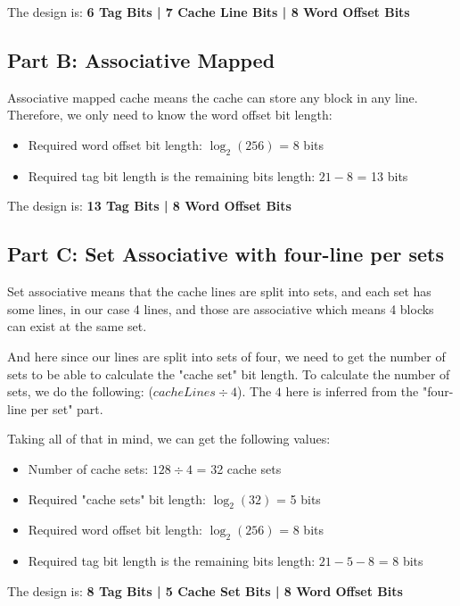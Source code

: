 \documentclass[a4paper]{article}
\begin{document}
The design is: \textbf{6 Tag Bits | 7 Cache Line Bits | 8 Word Offset Bits}

\subsection{Part B: Associative Mapped}

Associative mapped cache means the cache can store any block in any line. Therefore, we only need to know the word offset bit length:

\begin{itemize}
    \item Required word offset bit length: $\log_2(256)$ = 8 bits
    \item Required tag bit length is the remaining bits length: $21 - 8$ = 13 bits
\end{itemize}

The design is: \textbf{13 Tag Bits | 8 Word Offset Bits}

\subsection{Part C: Set Associative with four-line per sets}

Set associative means that the cache lines are split into sets, and each set has some lines, in our case 4 lines, and those are associative which means 4 blocks can exist at the same set.

And here since our lines are split into sets of four, we need to get the number of sets to be able to calculate the "cache set" bit length. To calculate the number of sets, we do the following: ($cacheLines \div 4$). The $4$ here is inferred from the "four-line per set" part.

Taking all of that in mind, we can get the following values:

\begin{itemize}
    \item Number of cache sets: $128 \div 4$ = 32 cache sets
    \item Required "cache sets" bit length: $\log_2(32)$ = 5 bits
    \item Required word offset bit length: $\log_2(256)$ = 8 bits
    \item Required tag bit length is the remaining bits length: $21 - 5 - 8$ = 8 bits
\end{itemize}

The design is: \textbf{8 Tag Bits | 5 Cache Set Bits | 8 Word Offset Bits}
\end{document}
